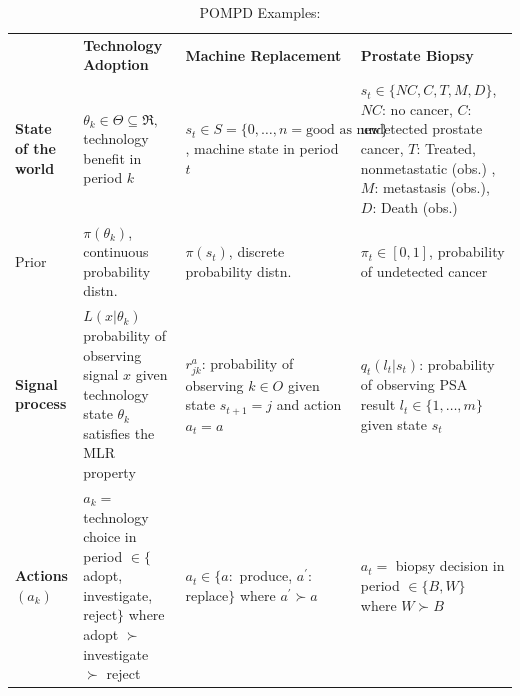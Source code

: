 \documentclass[11pt,onecolumn]{article}
\theoremstyle{plain}
\begin{document}
\begin{landscape}


\begin{table}[h!]
\footnotesize
\centering
\caption{POMPD Examples: \citet{ulu2009uncertainty, white1979optimal, zhang2012optimization}}
\renewcommand{\arraystretch}{1.4}
\begin{tabular}{>{\bfseries}p{2.5cm} p{6.5cm} p{6.5cm} p{5.5cm}}
\toprule
 & \textbf{Technology Adoption} & \textbf{Machine Replacement} & \textbf{Prostate Biopsy} \\
State of the world
    & $\theta_k \in \Theta \subseteq \Re, $ \newline technology benefit in period $k$
    & $s_t \in S=\{0,\ldots,n=\text{good as new}\}$, \newline machine state in period $t$
    & $s_t\in \{NC, C, T, M, D\}$, $NC$: no cancer, $C$: undetected prostate cancer,
    $T$: Treated, nonmetastatic (obs.) , \newline $M$: metastasis (obs.), $D$: Death (obs.)\\

\midrule

Prior
  &$\pi(\theta_k)$, \newline continuous probability distn.
  & $\pi(s_t)$, \newline discrete probability distn.
  & $\pi_t \in [0,1]$, \newline probability of undetected cancer \\

\midrule
Signal process
    & $L(x|\theta_k)$ probability of observing signal $x$ given technology state $\theta_k$ \newline
    satisfies the MLR property
    &$r_{jk}^a$: probability of observing $k\in O$ given state $s_{t+1}=j$ and action $a_t=a$
  & $q_t(l_t|s_t)$: probability of observing PSA result $l_t \in \{1,\ldots,m\}$
    given state $s_t$ \\

\midrule
Actions $(a_k)$
  & $a_k = $ technology choice in period\newline
    $\in \{$adopt, investigate, reject$\}$\newline
    where adopt $\succ$ investigate $\succ$ reject
  & $a_t \in \{a:$ produce, $a^\prime:$ replace$\}$\newline
  where  $a^\prime\succ a$
  & $a_t = $ biopsy decision in period  $\in \{B, W\}$\newline
   where $W\succ B$\\


\end{tabular}
\end{table}
\end{landscape}
\end{document}
